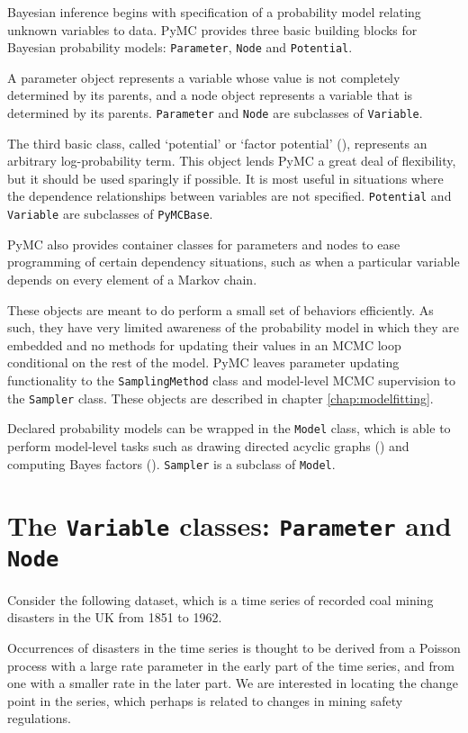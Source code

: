 
Bayesian inference begins with specification of a probability model relating unknown variables to data. PyMC provides three basic building blocks for Bayesian probability models: \texttt{Parameter}, \texttt{Node} and \texttt{Potential}. 

A parameter object represents a variable whose value is not completely determined by its parents, and a node object represents a variable that is determined by its parents. \texttt{Parameter} and \texttt{Node} are subclasses of \texttt{Variable}.

The third basic class, called `potential' or `factor potential' (\cite{dawidmarkov,jordangraphical}), represents an arbitrary log-probability term. This object lends PyMC a great deal of flexibility, but it should be used sparingly if possible. It is most useful in situations where the dependence relationships between variables are not specified. \texttt{Potential} and \texttt{Variable} are subclasses of \texttt{PyMCBase}.

PyMC also provides container classes for parameters and nodes to ease programming of certain dependency situations, such as when a particular variable depends on every element of a Markov chain.

These objects are meant to do perform a small set of behaviors efficiently. As such, they have very limited awareness of the probability model in which they are embedded and no methods for updating their values in an MCMC loop conditional on the rest of the model. PyMC leaves parameter updating functionality to the \texttt{SamplingMethod} class and model-level MCMC supervision to the \texttt{Sampler} class. These objects are described in chapter \ref{chap:modelfitting}. 

Declared probability models can be wrapped in the \texttt{Model} class, which is able to perform model-level tasks such as drawing directed acyclic graphs (\cite{dawidmarkov,jordangraphical}) and computing Bayes factors (\cite{gelman}). \texttt{Sampler} is a subclass of \texttt{Model}.

\section{The \texttt{Variable} classes: \texttt{Parameter} and \texttt{Node}}
Consider the following dataset, which is a time series of recorded coal mining disasters in the UK from 1851 to 1962.
\begin{center}
\end{center}
Occurrences of disasters in the time series is thought to be derived from a Poisson process with a large rate parameter in the early part of the time series, and from one with a smaller rate in the later part. We are interested in locating the change point in the series, which perhaps is related to changes in mining safety regulations.

